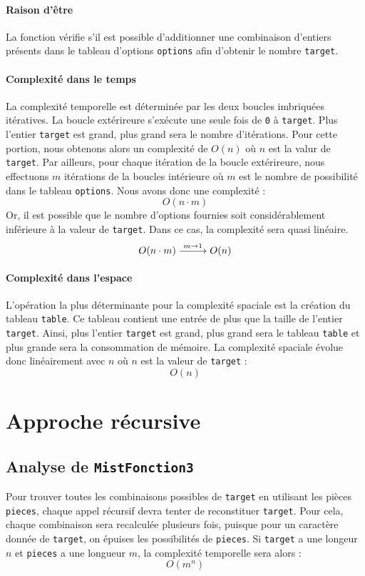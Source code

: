 \documentclass[10pt]{report}
\DeclareRobustCommand{\looongrightarrow}{%
  \DOTSB\relbar\joinrel\relbar\joinrel\relbar\joinrel\rightarrow
}
\DeclareRobustCommand{\looongrightarrow}{%
  \DOTSB\relbar\joinrel\relbar\joinrel\relbar\joinrel\rightarrow
}
\begin{document}
  \paragraph{Raison d'être}
  La fonction vérifie s'il est possible d'additionner une combinaison 
  d'entiers présents 
  dans le tableau d'options \texttt{options} afin d'obtenir le nombre 
  \texttt{target}.


  \paragraph{Complexité dans le temps}
  La complexité temporelle est déterminée par les deux boucles imbriquées 
  itératives. La boucle extérireure s'exécute une seule fois de 
  \texttt{0} à \texttt{target}. Plus l'entier \texttt{target} est grand, 
  plus grand sera le nombre d'itérations. Pour cette portion, nous obtenons alors 
  un complexité de $O(n)$ où $n$ est la valur de \texttt{target}. Par ailleurs, 
  pour chaque itération de la boucle extérireure, nous effectuons $m$ itérations 
  de la boucles intérieure où $m$ est le nombre de possibilité dans le 
  tableau \texttt{options}. Nous avons donc une complexité :
           \[ O( n \cdot m)\]
  Or, il est possible que le nombre d'options fournies soit considérablement 
  inférieure à la valeur de \texttt{target}. Dans ce cas, la complexité         
  sera quasi linéaire.  
          \[O(n \cdot m) \stackrel{m \to 1}{\looongrightarrow} O(n) \]


  \paragraph{Complexité dans l'espace}
  L'opération la plus déterminante pour la complexité spaciale est la création 
  du tableau \texttt{table}. Ce tableau contient une entrée de plus que la taille de l'entier 
  \texttt{target}. Ainsi, plus l'entier \texttt{target} est grand, plus grand 
  sera le tableau \texttt{table} et plus grande sera la consommation de mémoire. 
  La complexité spaciale évolue donc linéairement avec $n$ où $n$ est la 
  valeur de \texttt{target} :
  \[ O(n) \]


  \section{Approche récursive}
  \subsection{Analyse de {\texttt{MistFonction3}}}
  Pour trouver toutes les combinaisons possibles de \texttt{target} en utilisant les 
  pièces \texttt{pieces}, chaque appel récursif devra tenter de reconstituer 
  \texttt{target}. Pour cela, chaque combinaison sera recalculée plusieurs fois, 
  puisque pour un caractère donnée de \texttt{target}, on épuises les 
  possibilités de \texttt{pieces}. Si \texttt{target} a une longeur $n$ 
  et \texttt{pieces} a une longueur $m$, la complexité temporelle sera alors :
  \[ O(m^n) \]
\end{document}
